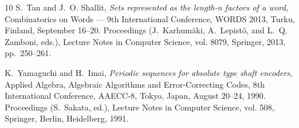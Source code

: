 \documentclass[a4paper,11pt]{article}
\theoremstyle{plain}
\theoremstyle{definition}
\theoremstyle{remark}
\begin{document}
\begin{thebibliography}{10}
 S.~Tan and J.~O. Shallit, \emph{Sets represented as the length-n factors of a
  word}, Combinatorics on Words --- 9th International Conference, {WORDS} 2013,
  Turku, Finland, September 16--20. Proceedings (J.~Karhum{\"{a}}ki,
  A.~Lepist{\"{o}}, and L.~Q. Zamboni, eds.), Lecture Notes in Computer
  Science, vol. 8079, Springer, 2013, pp.~250--261.

 K.~Yamaguchi and H.~Imai, \emph{Periodic sequences for absolute type
    shaft
  encoders}, Applied Algebra, Algebraic Algorithms and Error-Correcting Codes,
  8th International Conference, AAECC-8, Tokyo, Japan, August 20--24, 1990.
  Proceedings (S.~Sakata, ed.), Lecture Notes in Computer Science, vol. 508,
  Springer, Berlin, Heidelberg, 1991.

\end{thebibliography}
\end{document}
